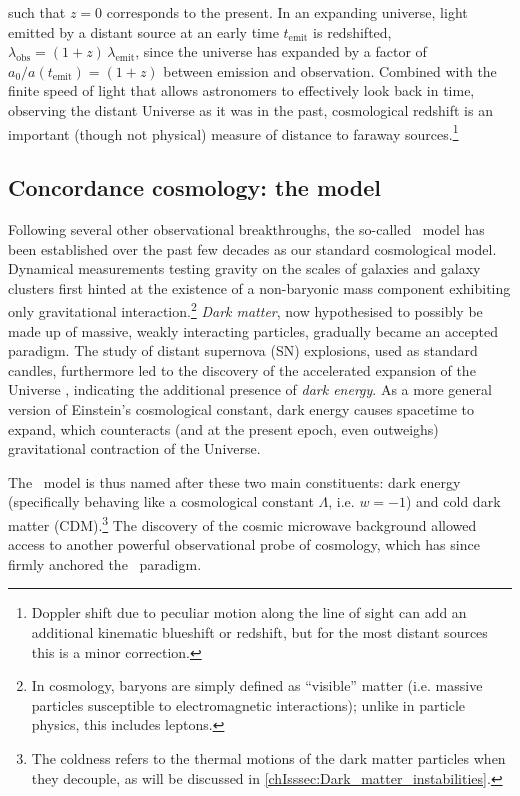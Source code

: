 \noindent such that $z = 0$ corresponds to the present. In an expanding universe, light emitted by a distant source at an early time $t_\text{emit}$ is redshifted, $\lambda_\text{obs} = (1 + z) \, \lambda_\text{emit}$, since the universe has expanded by a factor of $a_0 / a(t_\text{emit}) = (1 + z)$ between emission and observation. Combined with the finite speed of light that allows astronomers to effectively look back in time, observing the distant Universe as it was in the past, cosmological redshift is an important (though not physical) measure of distance to faraway sources.\footnote{Doppler shift due to peculiar motion along the line of sight can add an additional kinematic blueshift or redshift, but for the most distant sources this is a minor correction.}

\subsection{Concordance cosmology: the \texorpdfstring{\LCDM}{ΛCDM} model}
\label{chIssec:LCDM_model}

Following several other observational breakthroughs, the so-called \LCDM\ model has been established over the past few decades as our standard cosmological model. Dynamical measurements testing gravity on the scales of galaxies and galaxy clusters \citep{1933AcHPh...6..110Z, 1973A&A....26..483R, 1974Natur.250..309E, 1974ApJ...193L...1O, 1978ApJ...225L.107R, 1980ApJ...238..471R} first hinted at the existence of a non-baryonic mass component exhibiting only gravitational interaction.\footnote{In cosmology, baryons are simply defined as ``visible'' matter (i.e. massive particles susceptible to electromagnetic interactions); unlike in particle physics, this includes leptons.} \textit{Dark matter}, now hypothesised to possibly be made up of massive, weakly interacting particles, gradually became an accepted paradigm. The study of distant supernova (SN) explosions, used as standard candles, furthermore led to the discovery of the accelerated expansion of the Universe \citep{1998AJ....116.1009R, 1998ApJ...507...46S, 1999ApJ...517..565P}, indicating the additional presence of \textit{dark energy}. As a more general version of Einstein's cosmological constant, dark energy causes spacetime to expand, which counteracts (and at the present epoch, even outweighs) gravitational contraction of the Universe.

The \LCDM\ model is thus named after these two main constituents: dark energy (specifically behaving like a cosmological constant $\Lambda$, i.e. $w = -1$) and cold dark matter (CDM).\footnote{The coldness refers to the thermal motions of the dark matter particles when they decouple, as will be discussed in \cref{chIsssec:Dark_matter_instabilities}.} The discovery of the cosmic microwave background \citep[CMB;][]{1965ApJ...142..419P, 1965ApJ...142..414D} allowed access to another powerful observational probe of cosmology, which has since firmly anchored the \LCDM\ paradigm.

